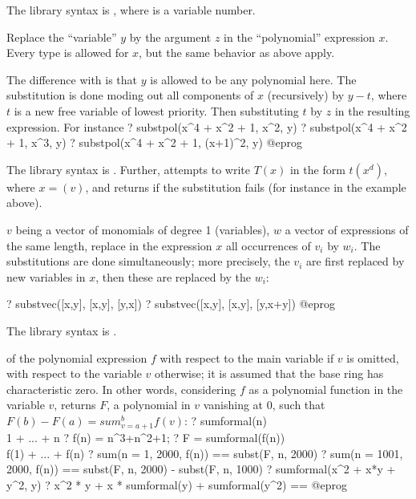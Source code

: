 The library syntax is , where  is a variable number.

\label{se:substpol}
Replace the ``variable'' $y$ by the argument $z$ in the ``polynomial''
expression $x$. Every type is allowed for $x$, but the same behavior
as  above apply.

The difference with  is that $y$ is allowed to be any polynomial
here. The substitution is done moding out all components of $x$
(recursively) by $y - t$, where $t$ is a new free variable of lowest
priority. Then substituting $t$ by $z$ in the resulting expression. For
instance
\bprog
? substpol(x^4 + x^2 + 1, x^2, y)
? substpol(x^4 + x^2 + 1, x^3, y)
? substpol(x^4 + x^2 + 1, (x+1)^2, y)
@eprog

The library syntax is .
Further,  attempts to
write $T(x)$ in the form $t(x^d)$, where $x=$$(v)$, and returns
 if the substitution fails (for instance in the example 
above).

\label{se:substvec}
$v$ being a vector of monomials of degree 1 (variables),
$w$ a vector of expressions of the same length, replace in the expression
$x$ all occurrences of $v_i$ by $w_i$. The substitutions are done
simultaneously; more precisely, the $v_i$ are first replaced by new
variables in $x$, then these are replaced by the $w_i$:

\bprog
? substvec([x,y], [x,y], [y,x])
? substvec([x,y], [x,y], [y,x+y])
@eprog

The library syntax is .

\label{se:sumformal}
 of the polynomial expression $f$ with respect to the
main variable if $v$ is omitted, with respect to the variable $v$ otherwise;
it is assumed that the base ring has characteristic zero. In other words,
considering $f$ as a polynomial function in the variable $v$,
returns $F$, a polynomial in $v$ vanishing at $0$, such that $F(b) - F(a)
= sum_{v = a+1}^b f(v)$:
\bprog
? sumformal(n)  \\ 1 + ... + n
? f(n) = n^3+n^2+1;
? F = sumformal(f(n))  \\ f(1) + ... + f(n)
? sum(n = 1, 2000, f(n)) == subst(F, n, 2000)
? sum(n = 1001, 2000, f(n)) == subst(F, n, 2000) - subst(F, n, 1000)
? sumformal(x^2 + x*y + y^2, y)
? x^2 * y + x * sumformal(y) + sumformal(y^2) == %
@eprog

